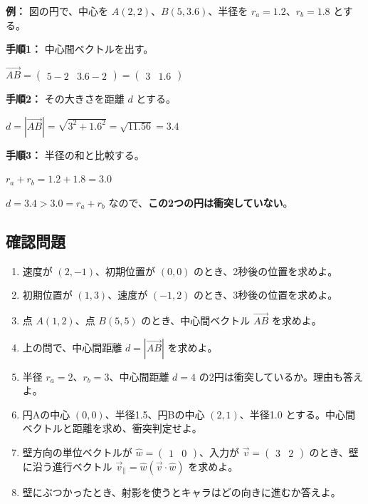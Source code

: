 \documentclass[paper=a4,fleqn,11pt]{jlreq}
\begin{document}
\textbf{例：} 図の円で、中心を \(A(2,2)\)、\(B(5,3.6)\)、半径を \(r_a=1.2\)、\(r_b=1.8\) とする。

\textbf{手順1：} 中心間ベクトルを出す。
\begin{center}
\(\overrightarrow{AB}=\begin{pmatrix}5-2 & 3.6-2\end{pmatrix}=\begin{pmatrix}3 & 1.6\end{pmatrix}\)
\end{center}

\textbf{手順2：} その大きさを距離 \(d\) とする。
\begin{center}
\(d=|\overrightarrow{AB}|=\sqrt{3^2+1.6^2}=\sqrt{11.56}=3.4\)
\end{center}

\textbf{手順3：} 半径の和と比較する。
\begin{center}
\(r_a+r_b=1.2+1.8=3.0\)
\end{center}

\(d=3.4 > 3.0=r_a+r_b\) なので、\textbf{この2つの円は衝突していない}。

\newpage
\subsection{確認問題}
\begin{enumerate}
  \item 速度が \((2,-1)\)、初期位置が \((0,0)\) のとき、2秒後の位置を求めよ。
  \item 初期位置が \((1,3)\)、速度が \((-1,2)\) のとき、3秒後の位置を求めよ。
  \item 点 \(A(1,2)\)、点 \(B(5,5)\) のとき、中心間ベクトル \(\overrightarrow{AB}\) を求めよ。
  \item 上の問で、中心間距離 \(d=|\overrightarrow{AB}|\) を求めよ。
  \item 半径 \(r_a=2\)、\(r_b=3\)、中心間距離 \(d=4\) の2円は衝突しているか。理由も答えよ。
  \item 円Aの中心 \((0,0)\)、半径1.5、円Bの中心 \((2,1)\)、半径1.0 とする。中心間ベクトルと距離を求め、衝突判定せよ。
  \item 壁方向の単位ベクトルが \(\hat{w}=\begin{pmatrix}1 & 0\end{pmatrix}\)、入力が \(\vec{v}=\begin{pmatrix}3 & 2\end{pmatrix}\) のとき、壁に沿う進行ベクトル \(\vec{v}_{\parallel}=\hat{w}(\vec{v}\cdot\hat{w})\) を求めよ。
  \item 壁にぶつかったとき、射影を使うとキャラはどの向きに進むか答えよ。
\end{enumerate}
\end{document}
